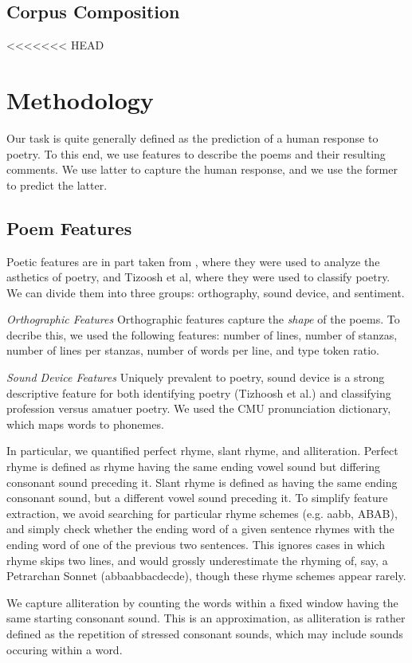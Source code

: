 \documentclass[11pt]{article}
\begin{document}
\subsection*{Corpus Composition}

<<<<<<< HEAD
\section{Methodology}
Our task is quite generally defined as the prediction of a human response to poetry. To this end, we use features to describe the poems and their resulting comments. We use latter to capture the human response, and we use the former to predict the latter.

\subsection*{Poem Features}
Poetic features are in part taken from , where they were used to analyze the asthetics of poetry, and Tizoosh et al, where they were used to classify poetry. We can divide them into three groups: orthography, sound device, and sentiment.

\emph{Orthographic Features}
Orthographic features capture the \emph{shape} of the poems. To decribe this, we used the following features: number of lines, number of stanzas, number of lines per stanzas, number of words per line, and type token ratio.

\emph{Sound Device Features}
Uniquely prevalent to poetry, sound device is a strong descriptive feature for both identifying poetry (Tizhoosh et al.) and classifying profession versus amatuer poetry. We used the CMU pronunciation dictionary, which maps words to phonemes.

In particular, we quantified perfect rhyme, slant rhyme, and alliteration. Perfect rhyme is defined as rhyme having the same ending vowel sound but differing consonant sound preceding it. Slant rhyme is defined as having the same ending consonant sound, but a different vowel sound preceding it. To simplify feature extraction, we avoid searching for particular rhyme schemes (e.g. aabb, ABAB), and simply check whether the ending word of a given sentence rhymes with the ending word of one of the previous two sentences. This ignores cases in which rhyme skips two lines, and would grossly underestimate the rhyming of, say, a Petrarchan Sonnet (abbaabbacdecde), though these rhyme schemes appear rarely.

We capture alliteration by counting the words within a fixed window having the same starting consonant sound. This is an approximation, as alliteration is rather defined as the repetition of stressed consonant sounds, which may include sounds occuring within a word.
\end{document}
